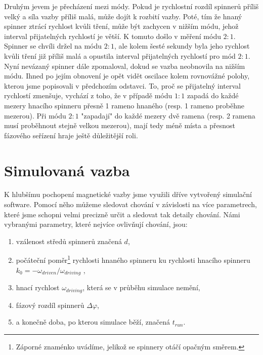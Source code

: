 Druhým jevem je přecházení mezi módy. Pokud je rychlostní rozdíl spinnerů příliš velký a síla vazby příliš malá, může dojít k rozbití vazby. Poté, tím že hnaný spinner ztrácí rychlost kvůli tření, může být zachycen v nižším módu, jehož interval přijatelných rychlostí je větší. K tomuto došlo v měření módu $2:1$. Spinner se chvíli držel na módu $2:1$, ale kolem šesté sekundy byla jeho rychlost kvůli tření již příliš malá a opustila interval přijatelných rychlostí pro mód $2:1$. Nyní nevázaný spinner dále zpomaloval, dokud se vazba neobnovila na nižším módu. Ihned po jejím obnovení je opět vidět oscilace kolem rovnovážné polohy, kterou jsme popisovali v předchozím odstavci. To, proč se přijatelný interval rychlostí zmenšuje, vychází z toho, že v případě módu $1:1$ zapadá do každé mezery hnacího spinneru přesně 1 rameno hnaného (resp. 1 rameno proběhne mezerou). Při módu $2:1$ "zapadají" do každé mezery dvě ramena (resp. 2 ramena musí proběhnout stejně velkou mezerou), mají tedy méně místa a přesnost fázového seřízení hraje ještě důležitější roli.

\clearpage

\section{Simulovaná vazba}

K hlubšímu pochopení magnetické vazby jsme využili dříve vytvořený simulační software. Pomocí něho můžeme sledovat chování v závislosti na více parametrech, které jsme schopni velmi precizně určit a sledovat tak detaily chování. Námi vybranými parametry, které nejvíce ovlivňují chování, jsou:

\begin{enumerate}[topsep=0pt, partopsep=0pt]
    \setlength{\itemsep}{0pt}%
    \setlength{\parskip}{0pt}%
    \item vzálenost středů spinnerů značená $d$,
    \item počáteční poměr\footnote{Záporné znaménko uvádíme, jelikož se spinnery otáčí opačným směrem.} rychlosti hnaného spinneru ku rychlosti hnacího spinneru $k_0 = -\omega_{driven} / \omega_{driving}$ ,
    \item hnací rychlost $\omega_{driving}$, která se v průběhu simulace nemění,
    \item fázový rozdíl spinnerů $\Delta \varphi$,
    \item a konečně doba, po kterou simulace běží, značená $t_{run}$. 
\end{enumerate}

